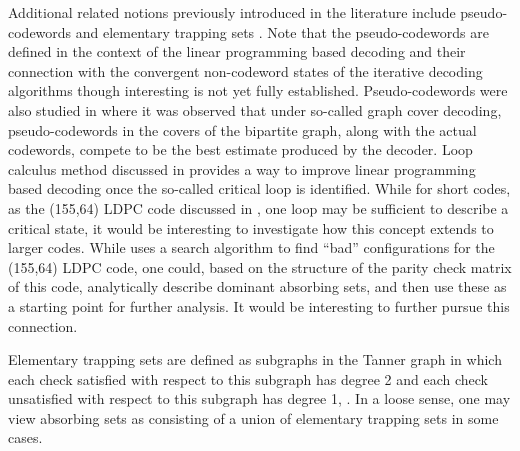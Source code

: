 Additional related notions previously introduced in the literature
include pseudo-codewords \cite{wainwrig} and elementary trapping
sets \cite{milenkov}. Note that the pseudo-codewords are defined
in the context of the linear programming based decoding and their
connection with the convergent non-codeword states of the
iterative decoding algorithms though interesting is not yet fully
established. Pseudo-codewords were also studied in \cite{vontobel}
where it was observed that under so-called graph cover decoding,
pseudo-codewords in the covers of the bipartite graph, along with
the actual codewords, compete to be the best estimate produced by
the decoder. Loop calculus method discussed in \cite{chertkov}
provides a way to improve linear programming based decoding once
the so-called critical loop is identified. While for short codes,
as the (155,64) LDPC code discussed in \cite{chertkov}, one loop
may be sufficient to describe a critical state, it would be
interesting to investigate how this concept extends to larger
codes. While \cite{chertkov} uses a search algorithm to find
``bad'' configurations for the (155,64) LDPC code, one could,
based on the structure of the parity check matrix of this code,
analytically describe dominant absorbing sets, and then use these
as a starting point for further analysis. It would be interesting
to further pursue this connection.

Elementary trapping sets are defined as subgraphs in the Tanner
graph in which each check satisfied with respect to this subgraph
has degree 2 and each check  unsatisfied with respect to this
subgraph has degree 1, \cite{milenkov}.  In a loose sense, one may view absorbing
sets as consisting of a union of elementary trapping sets in some
cases.
